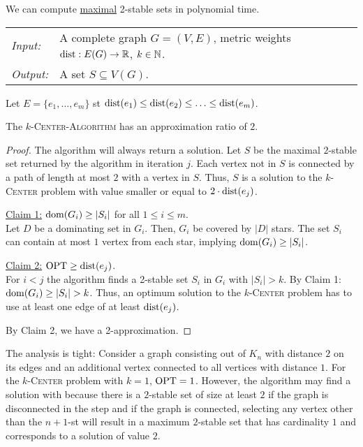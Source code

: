 \documentclass[../skript.tex]{subfiles}
\begin{document}
We can compute \underline{maximal} 2-stable sets in polynomial time.
\begin{algorithmbox}
\begin{tabular}{@{}ll}
\textit{Input:} & A complete graph $G = (V, E)$, metric weights $\operatorname*{dist} : E(G) \to \mathbb{R}$, $k \in \mathbb{N}$. \\
\textit{Output:} & A set $S \subseteq V(G)$.
\end{tabular}
\end{algorithmbox}
\vspace{-7pt}
\begin{algorithm}[H]
Let $E = \{ e_1, \ldots, e_m \}$ \ac{st} $\operatorname*{dist}(e_1) \leq \operatorname*{dist}(e_2) \leq \ldots \leq \operatorname*{dist}(e_m)$.\;
\end{algorithm}
\vspace{-7pt}
\EndAlgorithmLine
\begin{theorem} %
\label{thm:25}
The \textsc{$k$-Center-Algorithm} has an approximation ratio of $2$.
\end{theorem}
\begin{proof}
The algorithm will always return a solution.
Let $S$ be the maximal $2$-stable set returned by the algorithm in iteration $j$.
Each vertex not in $S$ is connected by a path of length at most $2$ with a vertex in $S$.
Thus, $S$ is a solution to the \textsc{$k$-Center} problem with value smaller or equal to $2 \cdot \operatorname*{dist}(e_j)$.

\underline{Claim 1:} $\operatorname{dom}(G_i) \geq |S_i|$ for all $1 \leq i \leq m$. \\
Let $D$ be a dominating set in $G_i$. Then, $G_i$ be covered by $|D|$ stars. The set $S_i$ can contain at most $1$ vertex from each star, implying $\operatorname{dom}(G_i) \geq |S_i|$.

\underline{Claim 2:} $\operatorname{OPT} \geq \operatorname*{dist}(e_j)$. \\
For $i < j$ the algorithm finds a 2-stable set $S_i$ in $G_i$ with $|S_i| > k$. By Claim 1: $\operatorname{dom}(G_i) \geq |S_i| > k$.
Thus, an optimum solution to the \textsc{$k$-Center} problem has to use at least one edge of at least $\operatorname*{dist}(e_j)$.

By Claim 2, we have a 2-approximation.
\end{proof} 
\begin{remark}
The analysis is tight:
Consider a graph consisting out of $K_n$ with distance $2$ on its edges and an additional vertex connected to all vertices with distance $1$. For the \textsc{$k$-Center} problem with $k = 1$, $\operatorname{OPT} = 1$. However, the algorithm may find a solution with because there is a $2$-stable set of size at least $2$ if the graph is disconnected in the step and if the graph is connected, selecting any vertex other than the $n+1$-st will result in a maximum $2$-stable set that has cardinality $1$ and corresponds to a solution of value $2$.
\end{remark}
\end{document}
